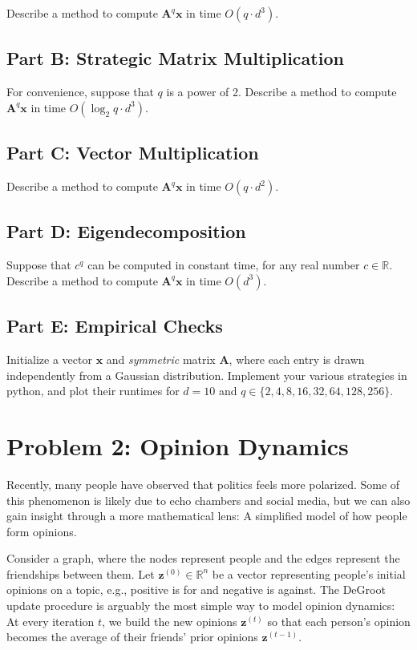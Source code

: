 \documentclass{article}
\begin{document}
Describe a method to compute $\mathbf{A}^q \mathbf{x}$ in time $O(q \cdot d^3)$.

\subsection*{Part B: Strategic Matrix Multiplication}

For convenience, suppose that $q$ is a power of 2.
Describe a method to compute $\mathbf{A}^q \mathbf{x}$ in time $O(\log_2 q \cdot d^3)$.

\subsection*{Part C: Vector Multiplication}

Describe a method to compute $\mathbf{A}^q \mathbf{x}$ in time $O(q \cdot d^2)$.

\subsection*{Part D: Eigendecomposition}

Suppose that $c^q$ can be computed in constant time, for any real number $c \in \mathbb{R}$.
Describe a method to compute $\mathbf{A}^q \mathbf{x}$ in time $O(d^3)$.

\subsection*{Part E: Empirical Checks}

Initialize a vector $\mathbf{x}$ and \textit{symmetric} matrix $\mathbf{A}$, where each entry is drawn independently from a Gaussian distribution.
Implement your various strategies in python, and plot their runtimes for $d=10$ and $q \in \{2, 4, 8, 16, 32, 64, 128, 256\}$.

%

\newpage \section*{Problem 2: Opinion Dynamics}

Recently, many people have observed that politics feels more polarized. 
Some of this phenomenon is likely due to echo chambers and social media, but we can also gain insight through a more mathematical lens:
A simplified model of how people form opinions.

Consider a graph, where the nodes represent people and the edges represent the friendships between them.
Let $\mathbf{z}^{(0)} \in \mathbb{R}^n$ be a vector representing people's initial opinions on a topic, e.g., positive is for and negative is against.
The DeGroot update procedure is arguably the most simple way to model opinion dynamics:
At every iteration $t$, we build the new opinions $\mathbf{z}^{(t)}$ so that each person's opinion becomes the average of their friends' prior opinions $\mathbf{z}^{(t-1)}$.
\end{document}
